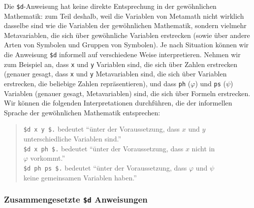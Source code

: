 Die \texttt{\$d}-Anweisung hat keine direkte Entsprechung in der gewöhnlichen Mathematik: zum Teil deshalb, weil die Variablen von Metamath nicht wirklich dasselbe sind wie die Variablen der gewöhnlichen Mathematik, sondern vielmehr Metavariablen, die sich über gewöhnliche Variablen erstrecken (sowie über andere Arten von Symbolen und Gruppen von Symbolen).  Je nach Situation können wir die Anweisung \texttt{\$d} informell auf verschiedene Weise interpretieren.  Nehmen wir zum Beispiel an, dass \texttt{x} und \texttt{y} Variablen sind, die sich über Zahlen erstrecken (genauer gesagt, dass \texttt{x} und \texttt{y} Metavariablen sind, die sich über Variablen erstrecken, die beliebige Zahlen repräsentieren), und dass \texttt{ph} ($\varphi$) und \texttt{ps} ($\psi$) Variablen (genauer gesagt, Metavariablen) sind, die sich über Formeln erstrecken.  Wir können die folgenden Interpretationen durchführen, die der informellen Sprache der gewöhnlichen Mathematik entsprechen:
\begin{quote}
\begin{tabbing}
\texttt{\$d x y \$.} bedeutet "`\=unter der Voraussetzung, dass $x$ und $y$\\ \>unterschiedliche Variablen sind."'\\
\texttt{\$d x ph \$.} bedeutet "`\=unter der Voraussetzung, dass $x$ nicht in\\ \>$\varphi$ vorkommt."'\\
\texttt{\$d ph ps \$.} bedeutet "`\=unter der Voraussetzung, dass $\varphi$ und $\psi$ \\ \>keine gemeinsamen Variablen haben."'
\end{tabbing}
\end{quote}

\subsubsection{Zusammengesetzte \texttt{\$d} Anweisungen}

